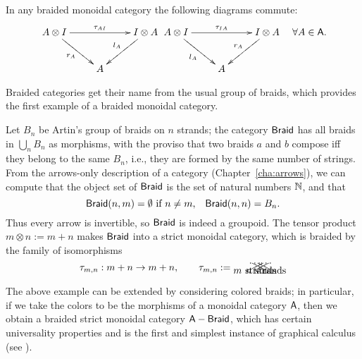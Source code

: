 \begin{proposition}
  In any braided monoidal category the following diagrams commute: 
  \begin{eqnarray*}
    \xymatrix{%
      A\otimes I
      &
      &
      I\otimes A
      \\
      &
      A
      &
      \ar "1,1";"1,3" ^{\tau_{AI}}
      \ar "1,1";"2,2" _{r_A}
      \ar "1,3";"2,2" _{l_A}
      }
    &
    \xymatrix{%
      A\otimes I
      &
      &
      I\otimes A
      \\
      &
      A
      &
      \ar "1,1";"1,3" ^{\tau_{IA}}
      \ar "1,1";"2,2" _{l_A}
      \ar "1,3";"2,2" _{r_A}
      }
    &
    \forall A \in \A.
  \end{eqnarray*}
\end{proposition}

Braided categories get their name from the usual group of braids,
which provides the first example of a braided monoidal category.
\begin{example}\label{xmp:braids}
  Let $B_n$ be Artin's group
  of braids on $n$ strands; the category $\mathsf{Braid}$ has all braids in
  $\bigcup_n B_n$ as morphisms, with the proviso that two braids  $a$ and
  $b$ compose iff they belong to the same $B_n$, i.e., they are formed
  by the same number of strings. From the arrows-only description of a
  category (Chapter~\ref{cha:arrows}), we can compute that the object
  set of $\mathsf{Braid}$ is the set of natural numbers $\mathbb{N}$, and that 
  \begin{equation*}
    \mathsf{Braid}(n,m) = \emptyset \text{ if $n\neq m$,} 
    \quad 
    \mathsf{Braid}(n,n) = B_n.
  \end{equation*}
  Thus every arrow is invertible, so $\mathsf{Braid}$ is indeed a
  groupoid. The tensor product $m\otimes n := m+n$ makes $\mathsf{Braid}$ into a
  strict monoidal category, which is braided by the family of
  isomorphisms
  \begin{equation*}
    \tau_{m,n}: m+n \to m+n, 
    \qquad
    \tau_{m,n} := {\xy*!C\xybox{%
      (0,0);(4,2)**\dir{-},
      (2,0);(6,2)**\dir{-},
      (1,0)*{\ldots},(5,2)*{\ldots},
      (1,-0.5)*\txt{$m$ strands},
      (4,0);(0,2)**\dir{-},
      (6,0);(2,2)**\dir{-},
      (5,0)*{\ldots}, (1,2)*{\ldots},
      (5,-0.5)*\txt{$n$ strands}
      }\endxy}
  \end{equation*}
\end{example}

The above example can be extended by considering colored braids; in
particular, if we take the colors to be the morphisms of a monoidal
category $\mathsf{A}$, then we obtain a braided strict monoidal category
$\mathsf{A}-\mathsf{Braid}$, which has certain universality properties and is the
first and simplest instance of graphical calculus (see
\cite{joyal-street;btc}).


